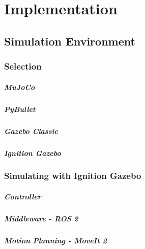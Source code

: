 \chapter{Implementation}\label{ch:implementation}




\section{Simulation Environment}

\subsection{Selection}
\paragraph{MuJoCo}
\paragraph{PyBullet}
\paragraph{Gazebo Classic}
\paragraph{Ignition Gazebo}

\subsection{Simulating with Ignition Gazebo}
\paragraph{Controller}
\paragraph{Middleware - ROS 2}
\paragraph{Motion Planning - MoveIt 2}



